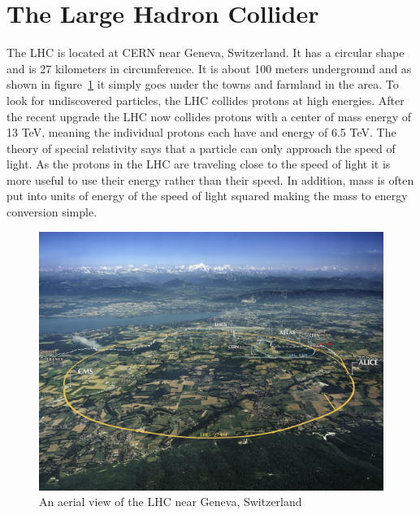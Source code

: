 
\section{The Large Hadron Collider}

The LHC is located at CERN near Geneva, Switzerland. It has a circular shape and is 27 kilometers in circumference. It is about 100 meters underground and as shown in figure~\ref{fig:LHC} it simply goes under the towns and farmland in the area. To look for undiscovered particles, the LHC collides protons at high energies. After the recent upgrade the LHC now collides protons with a center of mass energy of 13 TeV, meaning the individual protons each have and energy of 6.5 TeV. The theory of special relativity says that a particle can only approach the speed of light. As the protons in the LHC are traveling close to the speed of light it is more useful to use their energy rather than their speed. In addition, mass is often put into units of energy of the speed of light squared making the mass to energy conversion simple. 

\begin{figure}
\centering
\includegraphics[width=0.8\linewidth]{Figures/LHC.jpg}
\caption{An aerial view of the LHC near Geneva, Switzerland~\cite{LHC_view}}
\label{fig:LHC}
\end{figure}

